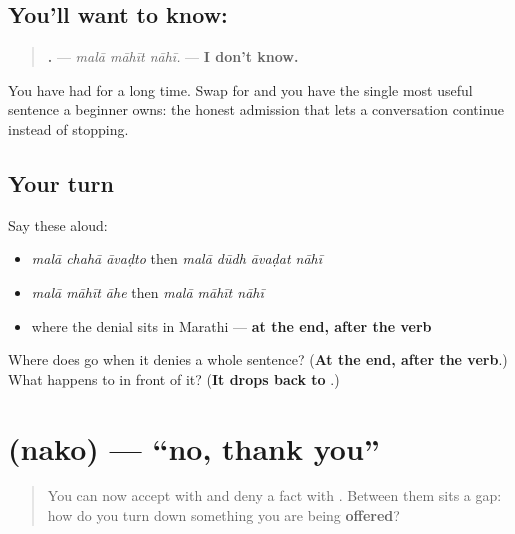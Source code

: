 \subsection*{You'll want to know:   }
\begin{quote}
\textbf{  .} — \emph{malā māhīt nāhī.} — \textbf{I don't know.}
\end{quote}

You have had \textbf{  } for a long time. Swap \textbf{} for \textbf{} and you have the single most useful sentence a beginner owns: the honest admission that lets a conversation continue instead of stopping.

\subsection*{Your turn}
Say these aloud:

\begin{itemize}
\raggedright
  \item \emph{malā chahā āvaḍto} then \emph{malā dūdh āvaḍat nāhī}
  \item \emph{malā māhīt āhe} then \emph{malā māhīt nāhī}
  \item where the denial sits in Marathi — \textbf{at the end, after the verb}
\end{itemize}

\begin{tcolorbox}[breakable,colback=teal!4,colframe=teal!35!black,title={Before you move on}]
Where does \textbf{} go when it denies a whole sentence? (\textbf{At the end, after the verb}.) What happens to \textbf{} in front of it? (\textbf{It drops back to }.)
\end{tcolorbox}
\section[\texorpdfstring{\mr{नको} (nako)}{नको (nako)}]{ (nako) — \textquotedblleft{}no, thank you\textquotedblright{}}

\label{lesson:MR-C32-nako}



\begin{quote}
You can now accept with \textbf{} and deny a fact with \textbf{}. Between them sits a gap: how do you turn down something you are being \textbf{offered}?
\end{quote}

